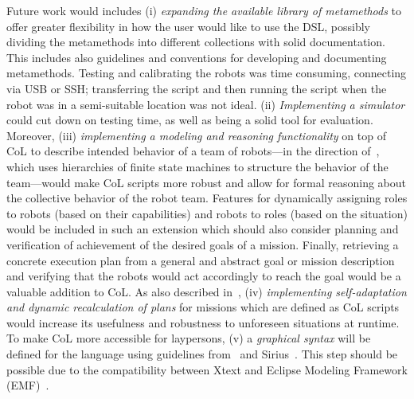 \documentclass[runningheads]{llncs}
\begin{document}
Future work would includes (i) \textit{expanding the available library of metamethods} to offer greater flexibility in how the user would like to use the DSL, possibly dividing the metamethods into different collections with solid documentation. This includes also guidelines and conventions for developing and documenting metamethods.
Testing and calibrating the robots was time consuming, connecting via USB or SSH; transferring the script and then running the script when the robot was in a semi-suitable location was not ideal. 
(ii) \textit{Implementing a simulator} could cut down on testing time, as well as being a solid tool for evaluation.
Moreover, (iii) \textit{implementing a modeling and reasoning functionality} on top of CoL to describe intended behavior of a team of robots---in the direction of~\cite{Hendrik}, which uses hierarchies of finite state machines to structure the behavior of the team---would make CoL scripts more robust and allow for formal reasoning about the collective behavior of the robot team. 
Features for dynamically assigning roles to robots (based on their capabilities) and robots to roles (based on the situation) would be included in such an extension which should also consider planning and verification of achievement of the desired goals of a mission. 
Finally, retrieving a concrete execution plan from a general and abstract goal or mission description and verifying that the robots would act accordingly to reach the goal would be a valuable addition to CoL. 
As also described in~\cite{Dragule}, (iv) \textit{implementing self-adaptation and dynamic recalculation of plans} for missions which are defined as CoL scripts would increase its usefulness and robustness to unforeseen situations at runtime.
To make CoL more accessible for laypersons, (v) a \textit{graphical syntax} will be defined for the language using guidelines from~\cite{SyntaxMap} and Sirius~\cite{Sirius}.
This step should be possible due to the compatibility between Xtext and Eclipse Modeling Framework (EMF)~\cite{emf}.


%
%


%
\end{document}
